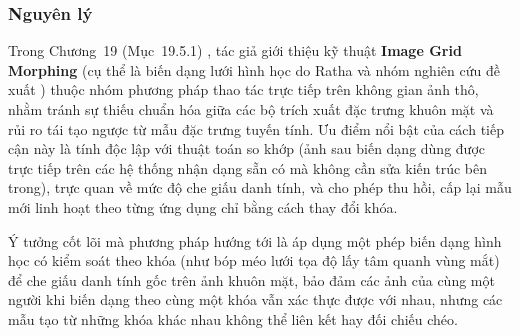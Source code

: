 \documentclass[oneside,a4paper,12pt]{extarticle}
\begin{document}
\begingroup
\setlength{\abovedisplayskip}{5pt plus 2pt minus 2pt}
\setlength{\belowdisplayskip}{5pt plus 2pt minus 2pt}

\subsubsection*{Nguyên lý}
Trong Chương~19 (Mục~19.5.1) \cite{adler2008}, tác giả giới thiệu kỹ thuật \textbf{Image Grid Morphing} (cụ thể là biến dạng lưới hình học do Ratha và nhóm nghiên cứu đề xuất \cite{ratha2001}) thuộc nhóm phương pháp thao tác trực tiếp trên không gian ảnh thô, nhằm tránh sự thiếu chuẩn hóa giữa các bộ trích xuất đặc trưng khuôn mặt và rủi ro tái tạo ngược từ mẫu đặc trưng tuyến tính. Ưu điểm nổi bật của cách tiếp cận này là tính độc lập với thuật toán so khớp (ảnh sau biến dạng dùng được trực tiếp trên các hệ thống nhận dạng sẵn có mà không cần sửa kiến trúc bên trong), trực quan về mức độ che giấu danh tính, và cho phép thu hồi, cấp lại mẫu mới linh hoạt theo từng ứng dụng chỉ bằng cách thay đổi khóa.

Ý tưởng cốt lõi mà phương pháp hướng tới là áp dụng một phép biến dạng hình học có kiểm soát theo khóa (như bóp méo lưới tọa độ lấy tâm quanh vùng mắt) để che giấu danh tính gốc trên ảnh khuôn mặt, bảo đảm các ảnh của cùng một người khi biến dạng theo cùng một khóa vẫn xác thực được với nhau, nhưng các mẫu tạo từ những khóa khác nhau không thể liên kết hay đối chiếu chéo.
\end{document}
